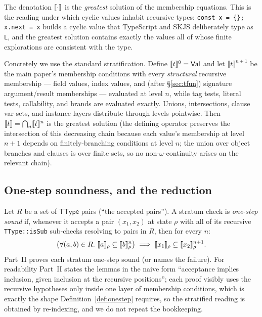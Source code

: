 \documentclass[11pt]{article}
\newcommand{\TType}{\mathsf{TType}}
\newcommand{\semn}[2]{\llbracket #1 \rrbracket^{#2}}
\begin{document}
\begin{definition}
\label{as:gfp}
The denotation $\llbracket \cdot \rrbracket$ is the \emph{greatest} solution of
the membership equations. This is the reading under which cyclic values
inhabit recursive types: \texttt{const x = \{\}; x.next = x} builds a
cyclic value that TypeScript and SKJS deliberately type as \texttt{L},
and the greatest solution contains exactly the values all of whose
finite explorations are consistent with the type.
\end{definition}

Concretely we use the standard stratification. Define
$\semn{t}{0} = \Val$ and let $\semn{t}{n+1}$ be the main paper's
membership conditions with every \emph{structural} recursive membership
--- field values, index values, and (after \S\ref{sec:tfun}) signature
argument/result memberships --- evaluated at level $n$, while tag tests,
literal tests, callability, and brands are evaluated exactly. Unions,
intersections, clause var-sets, and instance layers distribute through
levels pointwise. Then $\sem{t} = \bigcap_n \semn{t}{n}$ is the greatest
solution (the defining operator preserves the intersection of this
decreasing chain because each value's membership at level $n{+}1$
depends on finitely-branching conditions at level $n$; the union over
object branches and clauses is over finite sets, so no
non-$\omega$-continuity arises on the relevant chain).

\subsection{One-step soundness, and the reduction}

\begin{definition}
\label{def:onestep}
Let $R$ be a set of $\TType$ pairs (``the accepted pairs''). A stratum
check is \emph{one-step sound} if, whenever it accepts a pair
$(x_1, x_2)$ at state $\rho$ with all of its recursive
\texttt{TType::isSub} sub-checks resolving to pairs in $R$, then for
every $n$:
\[
\big(\forall (a,b) \in R.\ \sem{a}_\rho \subseteq \semn{b}{n}_\rho\big)
\implies
\sem{x_1}_\rho \subseteq \semn{x_2}{n+1}_\rho .
\]
Part~II proves each stratum one-step sound (or names the failure). For
readability Part~II states the lemmas in the naive form ``acceptance
implies inclusion, given inclusion at the recursive positions''; each
proof visibly uses the recursive hypotheses only inside one layer of
membership conditions, which is exactly the shape
Definition~\ref{def:onestep} requires, so the stratified reading is
obtained by re-indexing, and we do not repeat the bookkeeping.
\end{definition}
\end{document}
